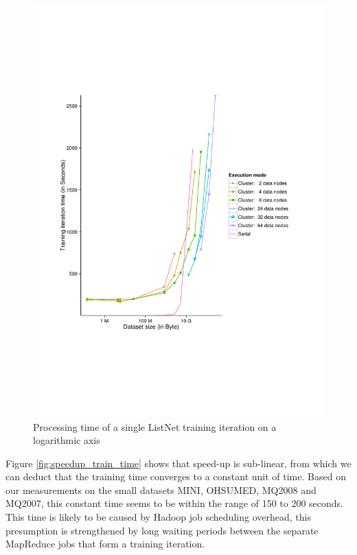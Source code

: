 \begin{figure}[!h]
\centering
\includegraphics[trim=0cm 5cm 0cm 5cm, scale=0.8]{gfx/time_single_logx.pdf}
\caption{Processing time of a single ListNet training iteration on a logarithmic axis}
\label{fig:listnet_train_time_log}
\end{figure}

Figure \ref{fig:speedup_train_time} shows that speed-up is sub-linear, from which we can deduct that the training time converges to a constant unit of time. Based on our measurements on the small datasets MINI, OHSUMED, MQ2008 and MQ2007, this constant time seems to be within the range of 150 to 200 seconds. This time is likely to be caused by Hadoop job scheduling overhead, this presumption is strengthened by long waiting periods between the separate MapReduce jobs that form a training iteration.\\

